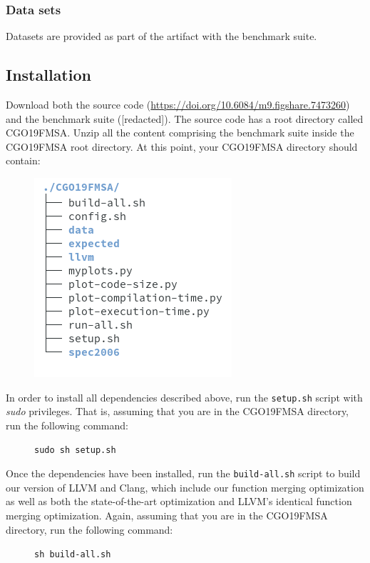 {\subsubsection{Data sets}

Datasets are provided as part of the artifact with the benchmark suite.

\subsection{Installation}

Download both the source code (\url{https://doi.org/10.6084/m9.figshare.7473260})
and the benchmark suite
([redacted]). %
The source code has a root directory called CGO19FMSA.
Unzip all the content comprising the benchmark suite inside the CGO19FMSA root directory.
At this point, your CGO19FMSA directory should contain:

\begin{figure}[h]
\includegraphics[scale=0.5]{figs/artifact/tree.png}
\end{figure}

In order to install all dependencies described above, run the \texttt{setup.sh}
script with \textit{sudo} privileges. That is, assuming that you are in the
CGO19FMSA directory, run the following command:

\begin{figure}[h]
\texttt{sudo sh setup.sh}
\end{figure}

Once the dependencies have been installed, run the \texttt{build-all.sh}
script to build our version of LLVM and Clang, which include our function
merging optimization as well as both the state-of-the-art optimization and LLVM's
identical function merging optimization.
Again, assuming that you are in the CGO19FMSA directory, run the following
command:
\newpage
\begin{figure}[h]
\texttt{sh build-all.sh}
\end{figure}

}
